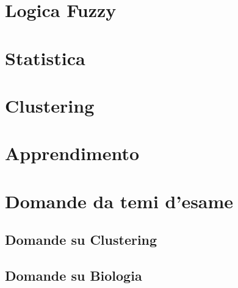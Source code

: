 \providecommand{\main}{.}





{\hypersetup{hidelinks}
  \tableofcontents  %
}

\chapter{Logica Fuzzy}


\chapter{Statistica}


\chapter{Clustering}


\chapter{Apprendimento}


\appendix
\chapter{Domande da temi d'esame}


\clearpage

\clearpage

\clearpage

\clearpage

\clearpage


\section{Domande su Clustering}


\section{Domande su Biologia}




